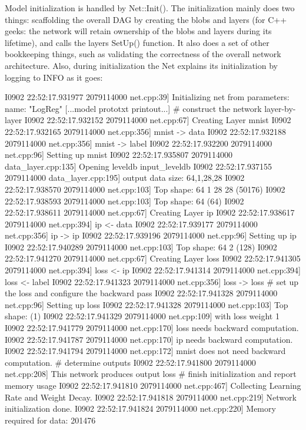 Model initialization is handled by {\ttfamily Net\+::\+Init()}. The initialization mainly does two things\+: scaffolding the overall D\+AG by creating the blobs and layers (for C++ geeks\+: the network will retain ownership of the blobs and layers during its lifetime), and calls the layers\textquotesingle{} {\ttfamily Set\+Up()} function. It also does a set of other bookkeeping things, such as validating the correctness of the overall network architecture. Also, during initialization the Net explains its initialization by logging to I\+N\+FO as it goes\+: \begin{DoxyVerb}I0902 22:52:17.931977 2079114000 net.cpp:39] Initializing net from parameters:
name: "LogReg"
[...model prototxt printout...]
# construct the network layer-by-layer
I0902 22:52:17.932152 2079114000 net.cpp:67] Creating Layer mnist
I0902 22:52:17.932165 2079114000 net.cpp:356] mnist -> data
I0902 22:52:17.932188 2079114000 net.cpp:356] mnist -> label
I0902 22:52:17.932200 2079114000 net.cpp:96] Setting up mnist
I0902 22:52:17.935807 2079114000 data_layer.cpp:135] Opening leveldb input_leveldb
I0902 22:52:17.937155 2079114000 data_layer.cpp:195] output data size: 64,1,28,28
I0902 22:52:17.938570 2079114000 net.cpp:103] Top shape: 64 1 28 28 (50176)
I0902 22:52:17.938593 2079114000 net.cpp:103] Top shape: 64 (64)
I0902 22:52:17.938611 2079114000 net.cpp:67] Creating Layer ip
I0902 22:52:17.938617 2079114000 net.cpp:394] ip <- data
I0902 22:52:17.939177 2079114000 net.cpp:356] ip -> ip
I0902 22:52:17.939196 2079114000 net.cpp:96] Setting up ip
I0902 22:52:17.940289 2079114000 net.cpp:103] Top shape: 64 2 (128)
I0902 22:52:17.941270 2079114000 net.cpp:67] Creating Layer loss
I0902 22:52:17.941305 2079114000 net.cpp:394] loss <- ip
I0902 22:52:17.941314 2079114000 net.cpp:394] loss <- label
I0902 22:52:17.941323 2079114000 net.cpp:356] loss -> loss
# set up the loss and configure the backward pass
I0902 22:52:17.941328 2079114000 net.cpp:96] Setting up loss
I0902 22:52:17.941328 2079114000 net.cpp:103] Top shape: (1)
I0902 22:52:17.941329 2079114000 net.cpp:109]     with loss weight 1
I0902 22:52:17.941779 2079114000 net.cpp:170] loss needs backward computation.
I0902 22:52:17.941787 2079114000 net.cpp:170] ip needs backward computation.
I0902 22:52:17.941794 2079114000 net.cpp:172] mnist does not need backward computation.
# determine outputs
I0902 22:52:17.941800 2079114000 net.cpp:208] This network produces output loss
# finish initialization and report memory usage
I0902 22:52:17.941810 2079114000 net.cpp:467] Collecting Learning Rate and Weight Decay.
I0902 22:52:17.941818 2079114000 net.cpp:219] Network initialization done.
I0902 22:52:17.941824 2079114000 net.cpp:220] Memory required for data: 201476
\end{DoxyVerb}



